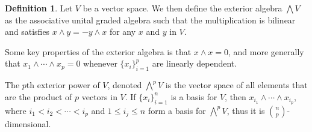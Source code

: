 \documentclass[11pt, a4paper, english]{article}
\theoremstyle{definition}
\newtheorem{defin}[theorem]{Definition}
\begin{document}
\begin{defin}
Let $V$ be a vector space. We then define the exterior algebra $\bigwedge V$ as the associative unital graded algebra such that the multiplication is bilinear and satisfies $x \wedge y = -y \wedge x$ for any $x$ and $y$ in $V$.
\end{defin}
Some key properties of the exterior algebra is that $x \wedge x = 0$, and more generally that $x_1 \wedge \cdots \wedge x_p = 0$ whenever $\{x_i\}_{i=1}^p$ are linearly dependent.

The $p$th exterior power of $V$, denoted $\bigwedge\limits^p V$ is the vector space of all elements that are the product of $p$ vectors in $V$. If $\{ x_i \}_{i=1}^n$ is a basis for $V$, then $x_{i_1} \wedge \cdots \wedge x_{i_p}$, where $i_1 < i_2 < \cdots < i_p$ and $1 \leq i_j \leq n$ form a basis for $\bigwedge\limits^p V$, thus it is ${n \choose p}$-dimensional. 
\end{document}
